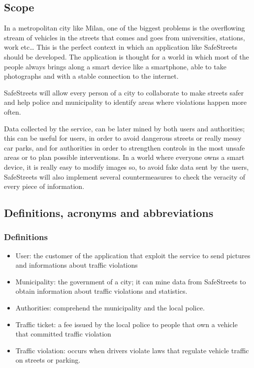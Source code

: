 \subsection{Scope}
In a metropolitan city like Milan, one of the biggest problems is the overflowing stream of vehicles in the streets that comes and goes from universities, stations, work etc…  \newline
This is the perfect context in which an application like SafeStreets should be developed.  \newline
The application is thought for a world in which most of the people always brings along a smart device like a smartphone, able to take photographs and with a stable connection to the internet.  \newline\par
SafeStreets will allow every person of a city to collaborate to make streets safer and help police and municipality to identify areas where violations happen more often.  \newline\par
Data collected by the service, can be later mined by both users and authorities; this can be useful for users, in order to avoid dangerous streets or really messy car parks, and for authorities in order to strengthen controls in the most unsafe areas or to plan possible interventions.  \newline
In a world where everyone owns a smart device, it is really easy to modify images so, to avoid fake data sent by the users, SafeStreets will also implement several countermeasures to check the veracity of every piece of information. 
\subsection{Definitions, acronyms and abbreviations }
\subsubsection{Definitions}
\begin{itemize}
	\item User: the customer of the application that exploit the service to send pictures and informations about traffic violations 
	\item Municipality: the government of a city; it can mine data from SafeStreets to obtain information about traffic violations and statistics.
	\item Authorities: comprehend the municipality and the local police. 
	\item Traffic ticket: a fee issued by the local police to people that own a vehicle that committed traffic violation 
	\item Traffic violation: occurs when drivers violate laws that regulate vehicle traffic on streets or parking. 
\end{itemize}
